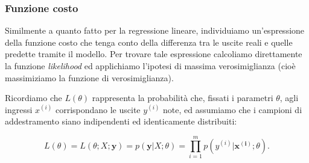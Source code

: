 \subsubsection{Funzione costo}
Similmente a quanto fatto per la regressione lineare, individuiamo un'espressione della funzione costo che tenga conto della differenza tra le uscite reali e quelle predette tramite il modello. 
Per trovare tale espressione calcoliamo direttamente la funzione \emph{likelihood} ed applichiamo l'ipotesi di massima verosimiglianza (cioè massimiziamo la funzione di verosimiglianza).

Ricordiamo che $L(\theta)$ rappresenta la probabilità che, fissati i parametri $\theta$, agli ingressi $x^{(i)}$ corrispondano le uscite $y^{(i)}$ note, ed assumiamo che i campioni di addestramento siano indipendenti ed identicamente distribuiti:


\begin{equation}\label{eql_logistica}
   L(\theta) = L(\theta;X;\mathbf{y})=
    p(\mathbf{y}|X;\theta) 
    = \prod_{i=1}^m p(y^{(i)}|\mathbf{x^{(i)}};\theta).
 \end{equation}

